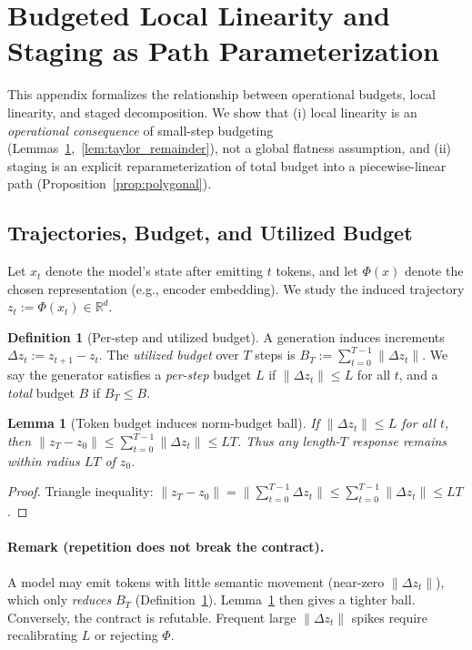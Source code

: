 \documentclass{article}
\theoremstyle{plain}
\newtheorem{lemma}[theorem]{Lemma}
\theoremstyle{definition}
\newtheorem{definition}[theorem]{Definition}
\theoremstyle{remark}
\begin{document}
\section{Budgeted Local Linearity and Staging as Path Parameterization}
\label{app:budgeted_local_linearity}\hypertarget{lim:internal}{}

This appendix formalizes the relationship between operational budgets, local linearity, and staged decomposition. We show that (i) local linearity is an \emph{operational consequence} of small-step budgeting (Lemmas~\ref{lem:token_to_ball},~\ref{lem:taylor_remainder}), not a global flatness assumption, and (ii) staging is an explicit reparameterization of total budget into a piecewise-linear path (Proposition~\ref{prop:polygonal}).

\subsection{Trajectories, Budget, and Utilized Budget}
Let $x_t$ denote the model's state after emitting $t$ tokens, and let $\Phi(x)$ denote the chosen representation (e.g., encoder embedding). We study the induced trajectory $z_t := \Phi(x_t) \in \mathbb{R}^d$.

\begin{definition}[Per-step and utilized budget]
\label{def:utilized_budget}
A generation induces increments $\Delta z_t := z_{t+1}-z_t$. The \emph{utilized budget} over $T$ steps is
$B_T := \sum_{t=0}^{T-1} \|\Delta z_t\|$.
We say the generator satisfies a \emph{per-step} budget $L$ if $\|\Delta z_t\| \le L$ for all $t$,
and a \emph{total} budget $B$ if $B_T \le B$.
\end{definition}

\begin{lemma}[Token budget induces norm-budget ball]
\label{lem:token_to_ball}
If $\|\Delta z_t\| \le L$ for all $t$, then
$\|z_T - z_0\| \le \sum_{t=0}^{T-1}\|\Delta z_t\| \le LT$.
Thus any length-$T$ response remains within radius $LT$ of $z_0$.
\end{lemma}
\begin{proof}
Triangle inequality: $\|z_T - z_0\| = \|\sum_{t=0}^{T-1}\Delta z_t\| \le \sum_{t=0}^{T-1}\|\Delta z_t\| \le LT$.
\end{proof}

\paragraph{Remark (repetition does not break the contract).}
A model may emit tokens with little semantic movement (near-zero $\|\Delta z_t\|$), which only \emph{reduces} $B_T$ (Definition~\ref{def:utilized_budget}). Lemma~\ref{lem:token_to_ball} then gives a tighter ball. Conversely, the contract is refutable. Frequent large $\|\Delta z_t\|$ spikes require recalibrating $L$ or rejecting $\Phi$.
\end{document}
